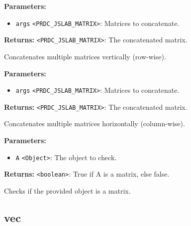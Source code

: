 \documentclass[12pt,a4paper]{article}
\begin{document}
\vspace{5mm}
\noindent {}


\noindent \textbf{Parameters:}
\begin{itemize}
  \item \texttt{args} \texttt{<PRDC\_JSLAB\_MATRIX>}: Matrices to concatenate.
\end{itemize}

\noindent \textbf{Returns:} \texttt{<PRDC\_JSLAB\_MATRIX>}: The concatenated matrix.

\noindent Concatenates multiple matrices vertically (row-wise).

\vspace{5mm}
\noindent {}


\noindent \textbf{Parameters:}
\begin{itemize}
  \item \texttt{args} \texttt{<PRDC\_JSLAB\_MATRIX>}: Matrices to concatenate.
\end{itemize}

\noindent \textbf{Returns:} \texttt{<PRDC\_JSLAB\_MATRIX>}: The concatenated matrix.

\noindent Concatenates multiple matrices horizontally (column-wise).

\vspace{5mm}
\noindent {}


\noindent \textbf{Parameters:}
\begin{itemize}
  \item \texttt{A} \texttt{<Object>}: The object to check.
\end{itemize}

\noindent \textbf{Returns:} \texttt{<boolean>}: True if A is a matrix, else false.

\noindent Checks if the provided object is a matrix.


\subsection{vec}
\vspace{5mm}
\noindent {}
\end{document}
